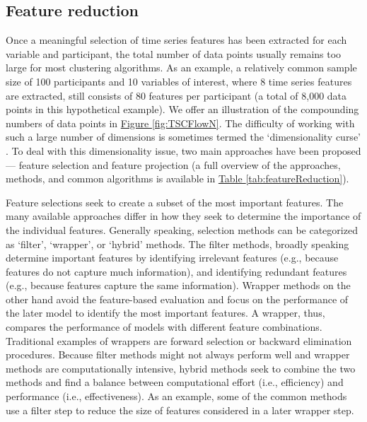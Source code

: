 \documentclass[man, 12pt, a4paper]{apa7}
\theoremstyle{break}
\theoremstyle{plain}
\newcommand{\fgrref}[2][]{\hyperref[#2]{Figure \ref*{#2}#1}}
\newcommand{\tblref}[2][]{\hyperref[#2]{Table \ref*{#2}#1}}
\begin{document}
\subsection{Feature reduction}
Once a meaningful selection of time series features has been extracted for each variable and participant, the total number of data points usually remains too large for most clustering algorithms. As an example, a relatively common sample size of 100 participants and 10 variables of interest, where 8 time series features are extracted, still consists of 80 features per participant (a total of 8,000 data points in this hypothetical example). We offer an illustration of the compounding numbers of data points in \fgrref{fig:TSCFlowN}. The difficulty of working with such a large number of dimensions is sometimes termed the `dimensionality curse' \citep[e.g.,][]{altman2018}. To deal with this dimensionality issue, two main approaches have been proposed --- feature selection and feature projection (a full overview of the approaches, methods, and common algorithms is available in \tblref{tab:featureReduction}). 

Feature selections seek to create a subset of the most important features. The many available approaches differ in how they seek to determine the importance of the individual features. Generally speaking, selection methods can be categorized as `filter', `wrapper', or `hybrid' methods. The filter methods, broadly speaking determine important features by identifying irrelevant features (e.g., because features do not capture much information), and identifying redundant features (e.g., because features capture the same information). Wrapper methods on the other hand avoid the feature-based evaluation and focus on the performance of the later model to identify the most important features. A wrapper, thus, compares the performance of models with different feature combinations. Traditional examples of wrappers are forward selection or backward elimination procedures. Because filter methods might not always perform well and wrapper methods are computationally intensive, hybrid methods seek to combine the two methods and find a balance between computational effort (i.e., efficiency) and performance (i.e., effectiveness). As an example, some of the common methods use a filter step to reduce the size of features considered in a later wrapper step.
\end{document}
